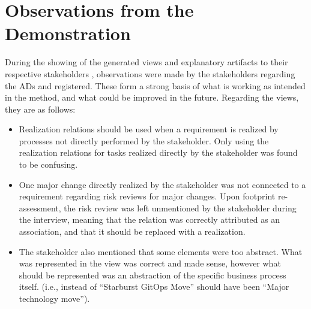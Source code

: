 



\section{Observations from the Demonstration}
\label{observations}

During the showing of the generated views and explanatory artifacts to their respective stakeholders , observations were made by the stakeholders regarding the \ac{AD}s and registered. These form a strong basis of what is working as intended in the method, and what could be improved in the future. Regarding the views, they are as follows: 
\begin{itemize}
    \item Realization relations should be used when a requirement is realized by processes not directly performed by the stakeholder. Only using the realization relations for tasks realized directly by the stakeholder was found to be confusing.
    \item One major change directly realized by the stakeholder was not connected to a requirement regarding risk reviews for major changes. Upon footprint re-assessment, the risk review was left unmentioned by the stakeholder during the interview, meaning that the relation was correctly attributed as an association, and that it should be replaced with a realization.
    \item The stakeholder also mentioned that some elements were too abstract. What was represented in the view was correct and made sense, however what should be represented was an abstraction of the specific business process itself. (i.e., instead of ``Starburst GitOps Move'' should have been ``Major technology move'').
\end{itemize}

